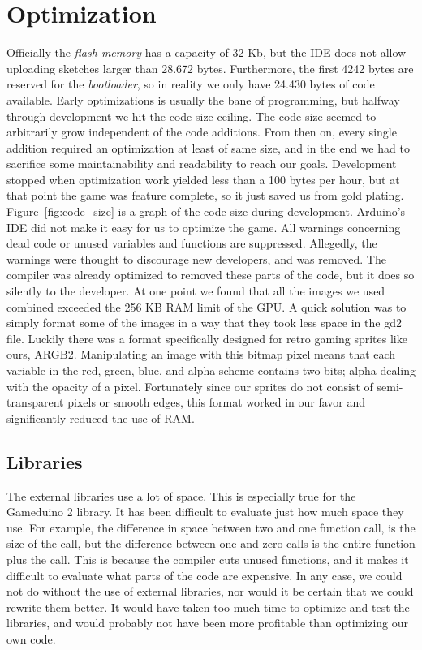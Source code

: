 \section{Optimization} %
Officially the \emph{flash memory} has a capacity of 32 Kb, but the IDE does not allow uploading sketches larger than 28.672 bytes. Furthermore, the first 4242 bytes are reserved for the \emph{bootloader}, so in reality we only have 24.430 bytes of code available. %
\newline
Early optimizations is usually the bane of programming, but halfway through development we hit the code size ceiling. The code size seemed to arbitrarily grow independent of the code additions. From then on, every single addition required an optimization at least of same size, and in the end we had to sacrifice some maintainability and readability to reach our goals. Development stopped when optimization work yielded less than a 100 bytes per hour, but at that point the game was feature complete, so it just saved us from gold plating. Figure~\ref{fig:code_size} is a graph of the code size during development.
\newline
Arduino's IDE did not make it easy for us to optimize the game. All warnings concerning dead code or unused variables and functions are suppressed. Allegedly, the warnings were thought to discourage new developers, and was removed. The compiler was already optimized to removed these parts of the code, but it does so silently to the developer.
\newline
At one point we found that all the images we used combined exceeded the 256 KB RAM limit of the GPU. A quick solution was to simply format some of the images in a way that they took less space in the gd2 file. Luckily there was a format specifically designed for retro gaming sprites like ours, ARGB2. Manipulating an image with this bitmap pixel means that each variable in the red, green, blue, and alpha scheme contains two bits; alpha dealing with the opacity of a pixel.  Fortunately since our sprites do not consist of semi-transparent pixels or smooth edges, this format worked in our favor and significantly reduced the use of RAM.

\subsection*{Libraries} %
The external libraries use a lot of space. This is especially true for the Gameduino 2 library. It has been difficult to evaluate just how much space they use. For example, the difference in space between two and one function call, is the size of the call, but the difference between one and zero calls is the entire function plus the call. This is because the compiler cuts unused functions, and it makes it difficult to evaluate what parts of the code are expensive.
\newline
In any case, we could not do without the use of external libraries, nor would it be certain that we could rewrite them better. It would have taken too much time to optimize and test the libraries, and would probably not have been more profitable than optimizing our own code.

